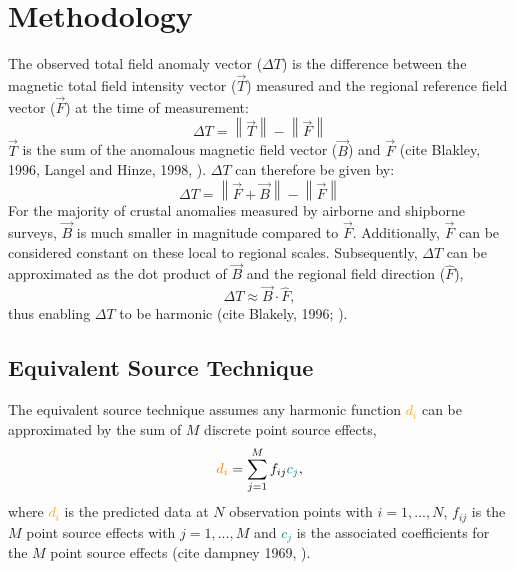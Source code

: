 \section{Methodology}
The observed total field anomaly vector ($\Delta T$) is the difference between the magnetic total field intensity vector ($\vec{T}$) measured and the regional reference field vector ($\vec{F}$) at the time of measurement:
\begin{equation}
    \Delta T = \left\lVert \vec{T} \right\rVert - \left\lVert \vec{F} \right\rVert
\end{equation}
$\vec{T}$ is the sum of the anomalous magnetic field vector ($\vec{B}$) and $\vec{F}$ (cite Blakley, 1996, Langel and Hinze, 1998, \citep{OliveiraJr2015}). $\Delta T$ can therefore be given by:
\begin{equation}
    \Delta T = \left\lVert \vec{F} + \vec{B} \right\rVert - \left\lVert \vec{F} \right\rVert
\end{equation}
For the majority of crustal anomalies measured by airborne and shipborne surveys, $\vec{B}$ is much smaller in magnitude compared to $\vec{F}$. Additionally, $\vec{F}$ can be considered constant on these local to regional scales. Subsequently, $\Delta T$ can be approximated as the dot product of $\vec{B}$ and the regional field direction ($\hat{F}$),
\begin{equation}
\label{'eq:tfa dot product'}
    \Delta T\approx  \vec{B} \cdot \hat{F},
\end{equation}
thus enabling $\Delta T$ to be harmonic (cite Blakely, 1996; \citep{OliveiraJr2015}).

\subsection{Equivalent Source Technique}
The equivalent source technique assumes any harmonic function \textcolor{orange}{$d_i$} can be approximated by the sum of $M$ discrete point source effects,
\begin{equation}
\label{'eq:eqs technique'}
\textcolor{orange}{d_i} = \sum_{j=1}^{M}  f_{ij} \textcolor{teal}{c_j},
\end{equation}
where \textcolor{orange}{$d_i$} is the predicted data at $N$ observation points with $i = 1, ... , N$, $f_{ij}$ is the $M$ point source effects with $j = 1, ..., M$ and \textcolor{teal}{$c_j$} is the associated coefficients for the $M$ point source effects (cite dampney 1969, \cite{Cordell1992}).

